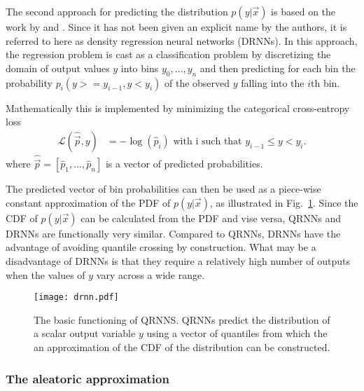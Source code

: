 The second approach for predicting the distribution $p(y|\vec{x})$ is based on
the work by \citet{oord16} and \citet{sonderby20}. Since it has not been given
an explicit name by the authors, it is referred to here as density regression
neural networks (DRNNs). In this approach, the regression problem is cast as a
classification problem by discretizing the domain of output values $y$ into bins
$y_0, \ldots, y_n$ and then predicting for each bin the probability $p_i(y >=
y_{i - 1}, y < y_i)$ of the observed $y$ falling into the $i$th bin.

Mathematically this is implemented by minimizing the
categorical cross-entropy loss
\begin{align}
  \mathcal{L}(\hat{\vec{p}}, y) &=  -\log(\hat{p}_i) \text { with i such that } y_{i - 1} \leq y < y_i.
\end{align}
where $\hat{\vec{p}} = [\hat{p}_1, \ldots, \hat{p}_n]$ is a vector of predicted probabilities.

The predicted vector of bin probabilities can then be used as a piece-wise
constant approximation of the PDF of $p(y | \vec{x})$, as illustrated in
Fig.~\ref{fig:machine_learning:drnn}. Since the CDF of $p(y | \vec{x})$ can be
calculated from the PDF and vise versa, QRNNs and DRNNs are functionally very
similar. Compared to QRNNs, DRNNs have the advantage of avoiding quantile
crossing by construction. What may be a disadvantage of DRNNs is that they require
a relatively high number of outputs  when the values of $y$ vary across a wide
range.
\begin{figure}[btp]
  \centering
  \texttt{[image: drnn.pdf]}
  \caption{The basic functioning of QRNNS. QRNNs predict the distribution of
    a scalar output variable $y$ using a vector of quantiles from which the
    an approximation of the CDF of the distribution can be constructed.}
  \label{fig:machine_learning:drnn}
\end{figure}

\subsubsection{The aleatoric approximation}

